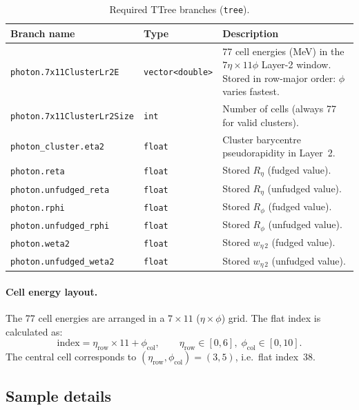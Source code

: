 \documentclass[12pt,a4paper]{article}
\begin{document}
\begin{table}[htbp]
\centering
\caption{Required TTree branches (\texttt{tree}).}
\label{tab:branches}
\small
\begin{tabular}{lll}
\toprule
\textbf{Branch name} & \textbf{Type} & \textbf{Description} \\
\midrule
\texttt{photon.7x11ClusterLr2E}
  & \texttt{vector<double>}
  & 77 cell energies (MeV) in the $7\eta\times11\phi$ Layer-2 window.
    Stored in row-major order: $\phi$ varies fastest. \\[3pt]
\texttt{photon.7x11ClusterLr2Size}
  & \texttt{int}
  & Number of cells (always 77 for valid clusters). \\[3pt]
\texttt{photon\_cluster.eta2}
  & \texttt{float}
  & Cluster barycentre pseudorapidity in Layer~2. \\[3pt]
\texttt{photon.reta}
  & \texttt{float}
  & Stored $R_\eta$ (fudged value). \\[3pt]
\texttt{photon.unfudged\_reta}
  & \texttt{float}
  & Stored $R_\eta$ (unfudged value). \\[3pt]
\texttt{photon.rphi}
  & \texttt{float}
  & Stored $R_\phi$ (fudged value). \\[3pt]
\texttt{photon.unfudged\_rphi}
  & \texttt{float}
  & Stored $R_\phi$ (unfudged value). \\[3pt]
\texttt{photon.weta2}
  & \texttt{float}
  & Stored $w_{\eta\,2}$ (fudged value). \\[3pt]
\texttt{photon.unfudged\_weta2}
  & \texttt{float}
  & Stored $w_{\eta\,2}$ (unfudged value). \\
\bottomrule
\end{tabular}
\end{table}

\paragraph{Cell energy layout.}
The 77 cell energies are arranged in a $7\times11$
($\eta\times\phi$) grid. The flat index is calculated as:
\begin{equation}
  \text{index} = \eta_\text{row} \times 11 + \phi_\text{col},
  \qquad
  \eta_\text{row} \in [0,6],\;
  \phi_\text{col} \in [0,10].
\end{equation}
The central cell corresponds to $(\eta_\text{row}, \phi_\text{col}) =
(3, 5)$, i.e.\ flat index~38.

\subsection{Sample details}
\end{document}
